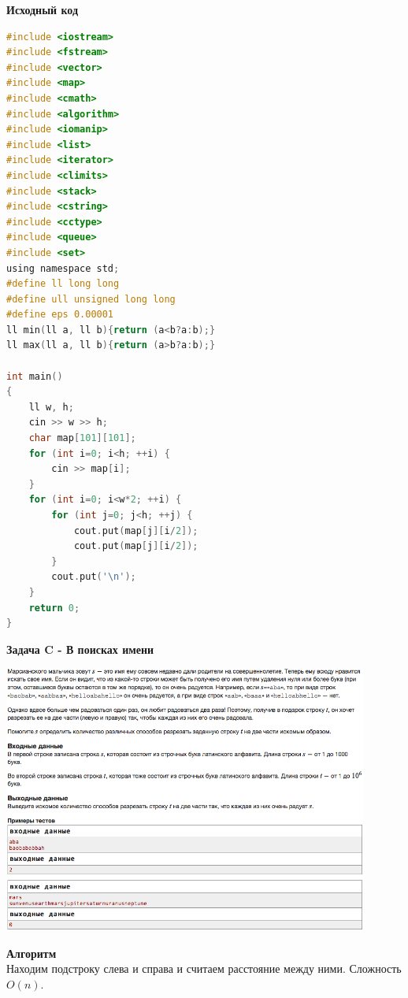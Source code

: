 \documentclass[a4paper,12pt]{article}
\begin{document}
\textbf{{\large Исходный код}}
\begin{lstlisting}[language=C]
#include <iostream>
#include <fstream>
#include <vector>
#include <map>
#include <cmath>
#include <algorithm>
#include <iomanip>
#include <list>
#include <iterator>
#include <climits>
#include <stack>
#include <cstring>
#include <cctype>
#include <queue>
#include <set>
using namespace std;
#define ll long long
#define ull unsigned long long
#define eps 0.00001
ll min(ll a, ll b){return (a<b?a:b);}
ll max(ll a, ll b){return (a>b?a:b);}

int main()
{
    ll w, h;
    cin >> w >> h;
    char map[101][101];
    for (int i=0; i<h; ++i) {
        cin >> map[i];
    }
    for (int i=0; i<w*2; ++i) {
        for (int j=0; j<h; ++j) {
            cout.put(map[j][i/2]);
            cout.put(map[j][i/2]);
        }
        cout.put('\n');
    }
    return 0;
}
\end{lstlisting}
\newpage
\textbf{{\large Задача C - В поисках имени}} \\
\begin{center}
\includegraphics[width=0.9\textwidth]{VK_Qual_2/VK_Qual_C.png}\\ [1cm]
\end{center}
\textbf{{\large Алгоритм}} \\
Находим подстроку слева и справа и считаем расстояние между ними. Сложность $O(n)$.\\
\end{document}
